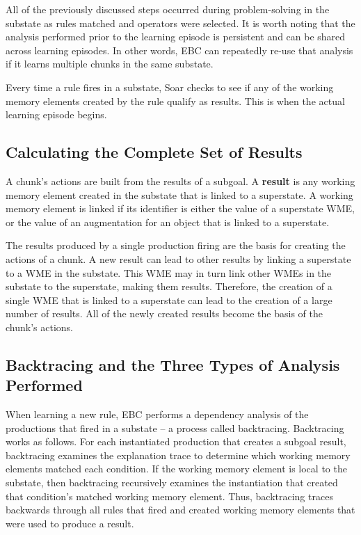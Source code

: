 All of the previously discussed steps occurred during problem-solving in the substate as rules matched and operators were selected.  It is worth noting that the analysis performed prior to the learning episode is persistent and can be shared across learning episodes.  In other words, EBC can repeatedly re-use that analysis if it learns multiple chunks in the same substate.  

Every time a rule fires in a substate, Soar checks to see if any of the working memory elements created by the rule qualify as results.  This is when the actual learning episode begins.

\subsection{Calculating the Complete Set of Results}
\label{CHUNKING-during-results}

A chunk's actions are built from the results of a subgoal. A \textbf{result} is any working memory element created in the substate that is linked to a superstate. A working memory element is linked if its identifier is either the value of a superstate WME, or the value of an augmentation for an object that is linked to a superstate.

The results produced by a single production firing are the basis for creating the actions of a chunk. A new result can lead to other results by linking a superstate to a WME in the substate. This WME may in turn link other WMEs in the substate to the superstate, making them results. Therefore, the creation of a single WME that is linked to a superstate can lead to the creation of a large number of results. All of the newly created results become the basis of the chunk's actions.

\subsection{Backtracing and the Three Types of Analysis Performed}
\label{CHUNKING-during-backtracing}

When learning a new rule, EBC performs a dependency analysis of the productions that fired in a substate -- a process called backtracing. Backtracing works as follows.  For each instantiated production that creates a subgoal result, backtracing examines the explanation trace to determine which working memory elements matched each condition. If the working memory element is local to the substate, then backtracing recursively examines the instantiation that created that condition's matched working memory element. Thus, backtracing traces backwards through all rules that fired and created working memory elements that were used to produce a result.

